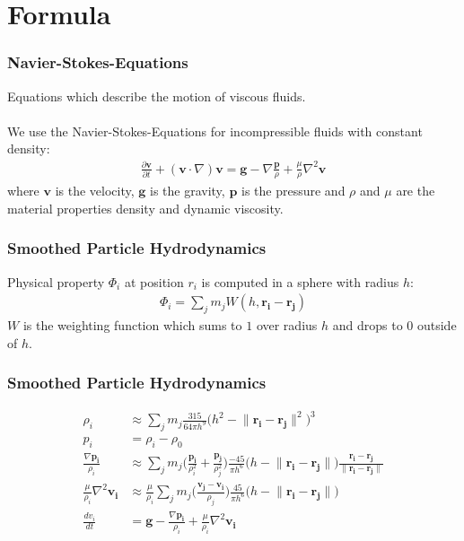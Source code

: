 \documentclass{beamer}
\begin{document}
\section{Formula}
\begin{frame}
    \frametitle{Navier-Stokes-Equations}
    Equations which describe the motion of viscous fluids.\\
    $\qquad$\\
    We use the Navier-Stokes-Equations for incompressible fluids with constant density:\\
    \begin{align*}
        \frac{\partial\boldsymbol{v}}{\partial t} + (\boldsymbol{v} \cdot \nabla )\boldsymbol{v} = 
        \boldsymbol{g} - \nabla \frac{\boldsymbol{p}}{\rho} + \frac{\mu}{\rho}\nabla^2\boldsymbol{v} 
    \end{align*}
    where $\boldsymbol{v}$ is the velocity, $\boldsymbol{g}$ is the gravity,
    $\boldsymbol{p}$ is the pressure and $\rho$ and $\mu$ are the material
    properties density and dynamic viscosity.
\end{frame}

\begin{frame}
    \frametitle{Smoothed Particle Hydrodynamics}
    Physical property $\Phi_i$ at position $r_i$ is computed in a sphere with radius $h$:
    \begin{align*}
        \Phi_i = \sum_j m_j W(h, \boldsymbol{r_i} - \boldsymbol{r_j})
    \end{align*}
    $W$ is the weighting function which sums to $1$ over radius $h$ and drops to $0$ outside of $h$.
\end{frame}

\begin{frame}
    \frametitle{Smoothed Particle Hydrodynamics}
    \begin{align*}
        \rho_i &\approx \sum_j m_j \frac{315}{64\pi h^9} \big(h^2-\lVert \boldsymbol{r_i} - \boldsymbol{r_j} \rVert^2\big)^3\\
        p_i &= \rho_i - \rho_0\\
        \frac{\nabla\boldsymbol{p_i}}{\rho_i} &\approx \sum_j m_j \bigg( \frac{\boldsymbol{p_i}}{\rho_i^2} + \frac{\boldsymbol{p_j}}{\rho_j^2}\bigg) 
        \frac{-45}{\pi h^6} \big(h-\lVert\boldsymbol{r_i} - \boldsymbol{r_j}\rVert\big) \frac{\boldsymbol{r_i} - \boldsymbol{r_j}}{\lVert \boldsymbol{r_i} - \boldsymbol{r_j}\rVert}\\
        \frac{\mu}{\rho_i}\nabla^2\boldsymbol{v_i} &\approx \frac{\mu}{\rho_i}\sum_j m_j \bigg(\frac{\boldsymbol{v_j} - \boldsymbol{v_i}}{\rho_j}\bigg)
        \frac{45}{\pi h^6}\big(h - \lVert\boldsymbol{r_i} - \boldsymbol{r_j}\rVert\big)\\
        \frac{dv_i}{dt} &= \boldsymbol{g} -  \frac{\nabla\boldsymbol{p_i}}{\rho_i} + \frac{\mu}{\rho_i}\nabla^2\boldsymbol{v_i}
    \end{align*}
\end{frame}
\end{document}
